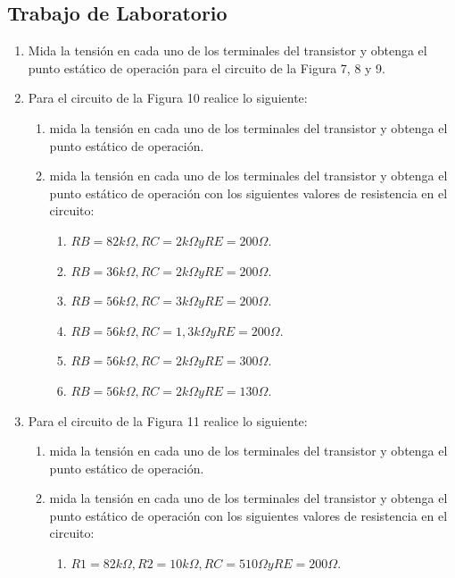 \documentclass[10pt, a4paper]{article}
\begin{document}
    \subsection{Trabajo de Laboratorio}

    \begin{enumerate}
        \item Mida la tensión en cada uno de los terminales del transistor y obtenga el punto estático de operación para el circuito de la Figura 7, 8 y 9.
        \item Para el circuito de la Figura 10 realice lo siguiente:
        \begin{enumerate}
            \item mida la tensión en cada uno de los terminales del transistor y obtenga el punto estático de operación.
            \item mida la tensión en cada uno de los terminales del transistor y obtenga el punto estático de operación con los siguientes valores de resistencia en el circuito:
            \begin{enumerate}
                \item $RB=82k\Omega, RC=2k\Omega y RE=200\Omega.$
                \item $RB=36k\Omega, RC=2k\Omega y RE=200\Omega.$
                \item $RB=56k\Omega, RC=3k\Omega y RE=200\Omega.$
                \item $RB=56k\Omega, RC=1,3k\Omega y RE=200\Omega.$ 
                \item $RB=56k\Omega, RC=2k\Omega y RE=300\Omega.$
                \item $RB=56k\Omega, RC=2k\Omega y RE=130\Omega.$
            \end{enumerate}
        \end{enumerate}
        \item Para el circuito de la Figura 11 realice lo siguiente:
        \begin{enumerate}
            \item mida la tensión en cada uno de los terminales del transistor y obtenga el punto estático de operación.
            \item mida la tensión en cada uno de los terminales del transistor y obtenga el punto estático de operación con los siguientes valores de resistencia en el circuito:
            \begin{enumerate}
                \item $R1=82k\Omega, R2=10k\Omega, RC=510\Omega y RE=200\Omega.$

\end{enumerate}
\end{enumerate}
\end{enumerate}
\end{document}
